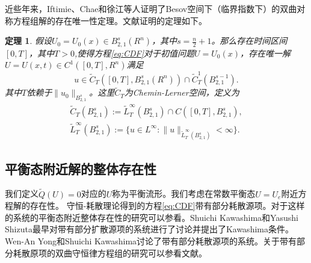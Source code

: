 \documentclass{article}
\newtheorem{theorem}{定理}
\begin{document}
	近些年来，Iftimie、Chae和徐江等人证明了Besov空间下（临界指数下）的双曲对称方程组解的存在唯一性定理\cite{}。文献\cite{}证明的定理如下。
	\begin{theorem}
		假设$U_0 =U_0(x) \in B_{2,1}^{s}(R^n)$，其中$s=\frac{n}{2} +1$。那么存在时间区间$[0,T]$，其中$T>0$,使得方程\eqref{eq:CDF}对于初值问题$U=U_0(x)$，存在唯一解$U = U(x,t) \in C^1([0,T],R^n)$满足
		\begin{equation*}
			u \in \tilde{C}_{T}([0,T],B_{2,1}^s(R^n)) \cap \tilde{C}^1_T(B_{2,1}^{s-1}).
		\end{equation*}
		其中$T$依赖于$\|u_0\|_{B^{s}_{2,1}}$。这里$\tilde{C}_T$为Chemin-Lerner空间，定义为
		\begin{eqnarray*}
			\tilde{C}_T(B_{2,1}^s):= \tilde{L}_T^\infty(B_{2,1}^s) \cap C([0,T],B_{2,1}^s), \\
			\tilde{L}_T^\infty(B_{2,1}^s) :=\{ u \in L^\infty: \|u\|_{\tilde{L}_T^\infty (B_{2,1}^s)} < \infty\}.
		\end{eqnarray*}
	\end{theorem}
	
	\subsection{平衡态附近解的整体存在性}
	我们定义$\tilde{Q}(U) = 0$对应的$U$称为平衡流形。我们考虑在常数平衡态$U=U_e$附近方程解的存在性。  
	守恒-耗散理论得到的方程\eqref{eq:CDF}带有部分耗散源项。对于这样的系统的平衡态附近整体存在性的研究可以参看\cite{}。Shuichi Kawashima和Yasushi Shizuta最早对带有部分扩散源项的系统进行了讨论并提出了Kawashima条件。Wen-An Yong和Shuichi Kawashima讨论了带有部分耗散源项的系统\cite{}。关于带有部分耗散原项的双曲守恒律方程组的研究可以参看文献\cite{}。
\end{document}
